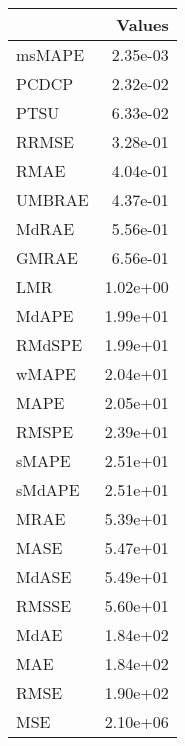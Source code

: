 \begin{tabular}{lr}
\toprule
 & Values \\
\midrule
msMAPE & 2.35e-03 \\
PCDCP & 2.32e-02 \\
PTSU & 6.33e-02 \\
RRMSE & 3.28e-01 \\
RMAE & 4.04e-01 \\
UMBRAE & 4.37e-01 \\
MdRAE & 5.56e-01 \\
GMRAE & 6.56e-01 \\
LMR & 1.02e+00 \\
MdAPE & 1.99e+01 \\
RMdSPE & 1.99e+01 \\
wMAPE & 2.04e+01 \\
MAPE & 2.05e+01 \\
RMSPE & 2.39e+01 \\
sMAPE & 2.51e+01 \\
sMdAPE & 2.51e+01 \\
MRAE & 5.39e+01 \\
MASE & 5.47e+01 \\
MdASE & 5.49e+01 \\
RMSSE & 5.60e+01 \\
MdAE & 1.84e+02 \\
MAE & 1.84e+02 \\
RMSE & 1.90e+02 \\
MSE & 2.10e+06 \\
\bottomrule
\end{tabular}
